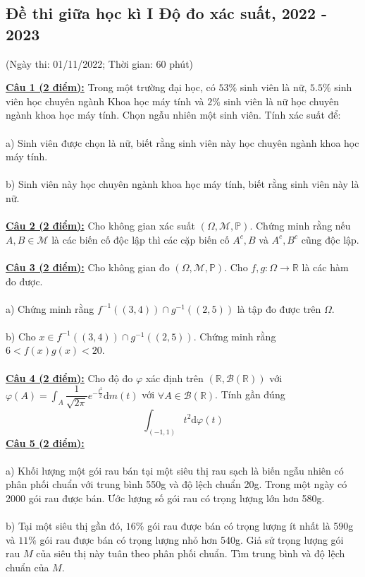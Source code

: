 \documentclass[10pt, a4paper]{article}
\begin{document}
\newpage

\subsection{Đề thi giữa học kì I Độ đo xác suất, 2022 - 2023}
\begin{center}
	\color{blue}(Ngày thi: 01/11/2022; Thời gian: 60 phút)
\end{center}
\color{red}\underline{\textbf{Câu 1 (2 điểm):}} \color{black}Trong một trường đại học, có $53\%$ sinh viên là nữ, $5.5\%$ sinh viên học chuyên ngành Khoa học máy tính và $2\%$ sinh viên là nữ học chuyên ngành khoa học máy tính. Chọn ngẫu nhiên một sinh viên. Tính xác suất để:\\\\
\color{red}a) \color{black}Sinh viên được chọn là nữ, biết rằng sinh viên này học chuyên ngành khoa học máy tính.\\\\
\color{red}b) \color{black}Sinh viên này học chuyên ngành khoa học máy tính, biết rằng sinh viên này là nữ.\\\\
\color{red}\underline{\textbf{Câu 2 (2 điểm):}} \color{black}Cho không gian xác suất $(\Omega,\mathcal M,\mathbb P)$. Chứng minh rằng nếu $A,B\in\mathcal M$ là các biến cố độc lập thì các cặp biến cố $A^c,B$ và $A^c,B^c$ cũng độc lập.\\\\
\color{red}\underline{\textbf{Câu 3 (2 điểm):}} \color{black}Cho không gian đo $(\Omega,\mathcal M,\mathbb P)$. Cho $f,g:\Omega\rightarrow\mathbb R$ là các hàm đo được.\\\\
\color{red}a) \color{black}Chứng minh rằng $f^{-1}((3,4))\cap g^{-1}((2,5))$ là tập đo được trên $\Omega$.\\\\
\color{red}b) \color{black}Cho $x\in f^{-1}((3,4))\cap g^{-1}((2,5))$. Chứng minh rằng $6<f(x)g(x)<20$.\\\\
\color{red}\underline{\textbf{Câu 4 (2 điểm):}} \color{black}Cho độ đo $\varphi$ xác định trên $(\mathbb R,\mathcal B(\mathbb R))$ với $\varphi(A)=\displaystyle\int_A\dfrac{1}{\sqrt{2\pi}}e^{-\frac{t^2}{2}}\text{d}m(t)$ với $\forall A\in\mathcal B(\mathbb R)$. Tính gần đúng $$\displaystyle\int_{(-1,1)}t^2\text{d}\varphi(t)$$
\color{red}\underline{\textbf{Câu 5 (2 điểm):}} \color{black}\\\\
\color{red}a) \color{black}Khối lượng một gói rau bán tại một siêu thị rau sạch là biến ngẫu nhiên có phân phối chuẩn với trung bình 550g và độ lệch chuẩn 20g. Trong một ngày có 2000 gói rau được bán. Ước lượng số gói rau có trọng lượng lớn hơn 580g.\\\\
\color{red}b) \color{black}Tại một siêu thị gần đó, $16\%$ gói rau được bán có trọng lượng ít nhất là 590g và $11\%$ gói rau được bán có trọng lượng nhỏ hơn 540g. Giả sử trọng lượng gói rau $M$ của siêu thị này tuân theo phân phối chuẩn. Tìm trung bình và độ lệch chuẩn của $M.$
\end{document}
